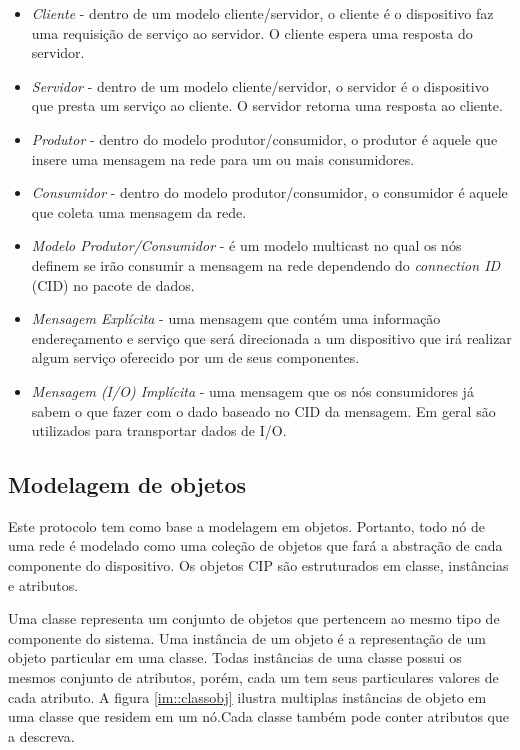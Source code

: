 \begin{itemize}
\item {\it Cliente} - dentro de um modelo cliente/servidor, o cliente é o dispositivo faz uma requisição de serviço ao servidor. O cliente espera uma resposta do servidor.
\item {\it Servidor} - dentro de um modelo cliente/servidor, o servidor é o dispositivo que presta um serviço ao cliente. O servidor retorna uma resposta ao cliente.
\item {\it Produtor} - dentro do modelo produtor/consumidor, o produtor é aquele que insere uma mensagem na rede para um ou mais consumidores.
\item {\it Consumidor} - dentro do modelo produtor/consumidor, o consumidor é aquele que coleta uma mensagem da rede.
\item {\it Modelo Produtor/Consumidor} - é um modelo multicast no qual os nós definem se irão consumir a mensagem na rede dependendo do {\it connection ID} (CID) no pacote de dados.
\item {\it Mensagem Explícita} - uma mensagem que contém uma informação endereçamento e serviço que será direcionada a um dispositivo que irá realizar algum serviço oferecido por um de seus componentes.
\item {\it Mensagem (I/O) Implícita} - uma mensagem que os nós consumidores já sabem o que fazer com o dado baseado no CID da mensagem. Em geral são utilizados para transportar dados de I/O.
\end{itemize}

\subsection{Modelagem de objetos}

Este protocolo tem como base a modelagem em objetos. Portanto, todo nó de uma rede é modelado como uma coleção de objetos que fará a abstração de cada componente do dispositivo. Os objetos CIP são estruturados em classe, instâncias e atributos.

Uma classe representa um conjunto de objetos que pertencem ao mesmo tipo de componente do sistema. Uma instância de um objeto é a representação de um objeto particular em uma classe. Todas instâncias de uma classe possui os mesmos conjunto de atributos, porém, cada um tem seus particulares valores de cada atributo. A figura \ref{im::classobj} ilustra multiplas instâncias de objeto em uma classe que residem em um nó.Cada classe também pode conter atributos que a descreva.

